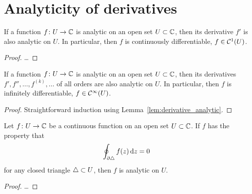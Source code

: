 \section{Analyticity of derivatives}

\begin{lemma}
  \label{lem:derivative_analytic}
  If a function $f \colon U \to \mathbb{C}$ is analytic on an open set $U \subset \mathbb{C}$,
  then its derivative $f'$ is also analytic on $U$.
  In particular, then $f$ is continuously differentiable,
  $f \in \mathcal{C}^{{1}}(U)$.
\end{lemma}
\begin{proof}
  \ldots
\end{proof}

\begin{corollary}
  \label{lem:higher_derivatives_analytic}
  If a function $f \colon U \to \mathbb{C}$ is analytic on an open set $U \subset \mathbb{C}$,
  then its derivatives $f', f'', \ldots, f^{(k)}, \ldots$ of all orders are
  also analytic on $U$.
  In particular, then $f$ is infinitely differentiable, $f \in \mathcal{C}^{{\infty}}(U)$.
\end{corollary}
\begin{proof}
  Straightforward induction using Lemma~\ref{lem:derivative_analytic}.
\end{proof}

\begin{theorem}
  \label{thm:morera}
  Let $f \colon U \to \mathbb{C}$ be a continuous function on an open set $U \subset \mathbb{C}$.
  If $f$ has the property that
  \begin{align*}
    \oint_{\partial \triangle} f(z) \, \mathrm{d} z = 0
  \end{align*}
  for any closed triangle $\triangle \subset U$, then $f$ is analytic on $U$.
\end{theorem}
\begin{proof}
  \ldots
\end{proof}

